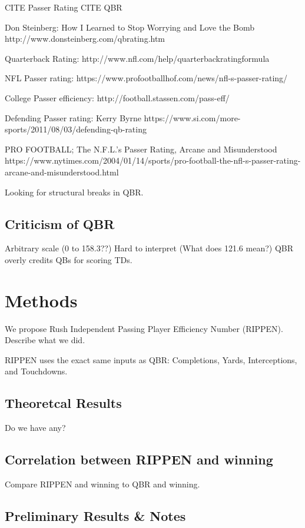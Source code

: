 \documentclass[aoas]{imsart}\usepackage[]{graphicx}\usepackage[]{color}
\begin{document}
CITE Passer Rating
CITE QBR

Don Steinberg: How I Learned to Stop Worrying and Love the Bomb
http://www.donsteinberg.com/qbrating.htm

Quarterback Rating: 
http://www.nfl.com/help/quarterbackratingformula

NFL Passer rating: 
https://www.profootballhof.com/news/nfl-s-passer-rating/

College Passer efficiency: 
http://football.stassen.com/pass-eff/

Defending Passer rating: Kerry Byrne
https://www.si.com/more-sports/2011/08/03/defending-qb-rating

PRO FOOTBALL; The N.F.L.'s Passer Rating, Arcane and Misunderstood
https://www.nytimes.com/2004/01/14/sports/pro-football-the-nfl-s-passer-rating-arcane-and-misunderstood.html

\cite{Stimel2009}
Looking for structural breaks in QBR.  

\cite{vanDohlen2011}

\subsection{Criticism of QBR}
Arbitrary scale (0 to 158.3??)
Hard to interpret (What does 121.6 mean?)
QBR overly credits QBs for scoring TDs.  





\section{Methods}
We propose Rush Independent Passing Player Efficiency Number (RIPPEN).  
Describe what we did.  

RIPPEN uses the exact same inputs as QBR: 
Completions, Yards, Interceptions, and Touchdowns.  

 

\subsection{Theoretcal Results}
Do we have any? 


\subsection{Correlation between RIPPEN and winning}
Compare RIPPEN and winning to QBR and winning.  

\subsection{Preliminary Results \& Notes}
\end{document}
